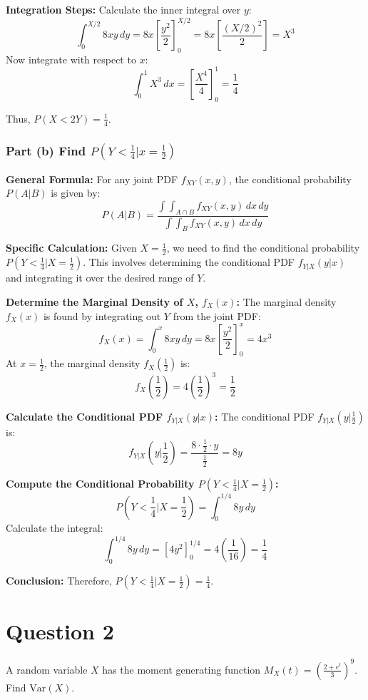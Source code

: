 \documentclass[12pt]{article}
\begin{document}
\textbf{Integration Steps:}
Calculate the inner integral over \( y \):
\[
  \int_0^{X/2} 8xy \, dy = 8x \left[ \frac{y^2}{2} \right]_0^{X/2} = 8x \left[ \frac{(X/2)^2}{2} \right] = X^3
\]
Now integrate with respect to \( x \):
\[
  \int_0^1 X^3 \, dx = \left[ \frac{X^4}{4} \right]_0^1 = \frac{1}{4}
\]

Thus, \( P(X < 2Y) = \frac{1}{4} \).

\subsubsection*{Part (b) Find \( P(Y < \frac{1}{4} |  x = \frac{1}{2}) \)}
\textbf{General Formula:}
For any joint PDF \( f_{XY}(x, y) \), the conditional probability \( P(A | B) \) is given by:
\[ P(A | B) = \frac{\int \int_{A \cap B} f_{XY}(x, y) \, dx \, dy}{\int \int_B f_{XY}(x, y) \, dx \, dy} \]

\textbf{Specific Calculation:}
Given \( X = \frac{1}{2} \), we need to find the conditional probability \( P(Y < \frac{1}{4} | X = \frac{1}{2}) \). This involves determining the conditional PDF \( f_{Y|X}(y|x) \) and integrating it over the desired range of \( Y \).

\textbf{Determine the Marginal Density of \( X \), \( f_X(x) \):}
The marginal density \( f_X(x) \) is found by integrating out \( Y \) from the joint PDF:
\[ f_X(x) = \int_0^x 8xy \, dy = 8x \left[ \frac{y^2}{2} \right]_0^x = 4x^3 \]
At \( x = \frac{1}{2} \), the marginal density \( f_X\left(\frac{1}{2}\right) \) is:
\[ f_X\left(\frac{1}{2}\right) = 4 \left(\frac{1}{2}\right)^3 = \frac{1}{2} \]

\textbf{Calculate the Conditional PDF \( f_{Y|X}(y|x) \):}
The conditional PDF \( f_{Y|X}(y|\frac{1}{2}) \) is:
\[ f_{Y|X}(y|\frac{1}{2}) = \frac{8 \cdot \frac{1}{2} \cdot y}{\frac{1}{2}} = 8y \]

\textbf{Compute the Conditional Probability \( P(Y < \frac{1}{4} | X = \frac{1}{2}) \):}
\[ P(Y < \frac{1}{4} | X = \frac{1}{2}) = \int_0^{1/4} 8y \, dy \]
Calculate the integral:
\[ \int_0^{1/4} 8y \, dy = \left[ 4y^2 \right]_0^{1/4} = 4 \left(\frac{1}{16}\right) = \frac{1}{4} \]

\textbf{Conclusion:}
Therefore, \( P(Y < \frac{1}{4} | X = \frac{1}{2}) = \frac{1}{4} \).

\newpage
\section*{Question 2}
A random variable \( X \) has the moment generating function \( M_X(t) = \left(\frac{2+e^t}{3}\right)^9 \). Find \( \text{Var}(X) \).
\end{document}
